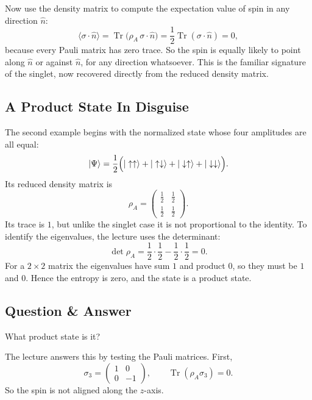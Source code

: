 Now use the density matrix to compute the expectation value of spin in any direction \(\hat n\):
\begin{equation}
\langle \sigma\cdot \hat n\rangle
=
\operatorname{Tr}\bigl(\rho_A\,\sigma\cdot \hat n\bigr)
=
\frac12 \operatorname{Tr}(\sigma\cdot \hat n)
=
0,
\end{equation}
because every Pauli matrix has zero trace. So the spin is equally likely to point along \(\hat n\) or against \(\hat n\), for any direction whatsoever. This is the familiar signature of the singlet, now recovered directly from the reduced density matrix.

\subsection{A Product State In Disguise}

The second example begins with the normalized state whose four amplitudes are all equal:
\begin{equation}
|\Psi\rangle
=
\frac12
\Bigl(
|\uparrow\uparrow\rangle
+
|\uparrow\downarrow\rangle
+
|\downarrow\uparrow\rangle
+
|\downarrow\downarrow\rangle
\Bigr).
\end{equation}
Its reduced density matrix is
\begin{equation}
\rho_A
=
\begin{pmatrix}
\frac12 & \frac12 \\[4pt]
\frac12 & \frac12
\end{pmatrix}.
\end{equation}
Its trace is \(1\), but unlike the singlet case it is not proportional to the identity. To identify the eigenvalues, the lecture uses the determinant:
\begin{equation}
\det \rho_A
=
\frac12\cdot\frac12 - \frac12\cdot\frac12
=
0.
\end{equation}
For a \(2\times2\) matrix the eigenvalues have sum \(1\) and product \(0\), so they must be \(1\) and \(0\). Hence the entropy is zero, and the state is a product state.

\subsection{Question \& Answer}

What product state is it?

The lecture answers this by testing the Pauli matrices. First,
\begin{equation}
\sigma_3 =
\begin{pmatrix}
1 & 0 \\[4pt]
0 & -1
\end{pmatrix},
\qquad
\operatorname{Tr}(\rho_A \sigma_3)=0.
\end{equation}
So the spin is not aligned along the \(z\)-axis.

